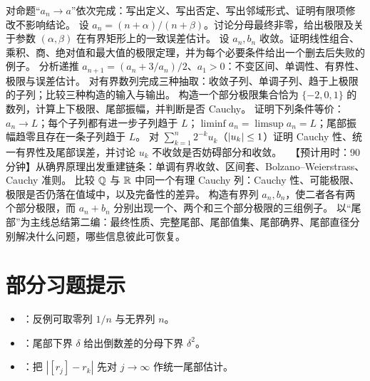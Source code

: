 \begin{enumerate}[label=\textbf{综.\arabic*.}]
  对命题“\(a_n\to a\)”依次完成：写出定义、写出否定、写出邻域形式、证明有限项修改不影响结论。
  设 \(a_n=(n+\alpha)/(n+\beta)\)。讨论分母最终非零，给出极限及关于参数 \((\alpha,\beta)\) 在有界矩形上的一致误差估计。
  设 \(a_n,b_n\) 收敛。证明线性组合、乘积、商、绝对值和最大值的极限定理，并为每个必要条件给出一个删去后失败的例子。
  分析递推 \(a_{n+1}=(a_n+3/a_n)/2\)、\(a_1>0\)：不变区间、单调性、有界性、极限与误差估计。
  对有界数列完成三种抽取：收敛子列、单调子列、趋于上极限的子列；比较三种构造的输入与输出。
  构造一个部分极限集合恰为 \(\{-2,0,1\}\) 的数列，计算上下极限、尾部振幅，并判断是否 Cauchy。
  证明下列条件等价：\(a_n\to L\)；每个子列都有进一步子列趋于 \(L\)；\(\liminf a_n=\limsup a_n=L\)；尾部振幅趋零且存在一条子列趋于 \(L\)。
  对 \(\sum_{k=1}^n2^{-k}u_k\)（\(\left|u_k\right|\le1\)）证明 Cauchy 性、统一有界性及尾部误差，并讨论 \(u_k\) 不收敛是否妨碍部分和收敛。
  \ 【预计用时：90分钟】从确界原理出发重建链条：单调有界收敛、区间套、Bolzano--Weierstrass、Cauchy 准则。
  比较 \(\mathbb{Q}\) 与 \(\mathbb{R}\) 中同一个有理 Cauchy 列：Cauchy 性、可能极限、极限是否仍落在值域中，以及完备性的差异。
  构造有界列 \(a_n,b_n\)，使二者各有两个部分极限，而 \(a_n+b_n\) 分别出现一个、两个和三个部分极限的三组例子。
  以“尾部”为主线总结第二编：最终性质、完整尾部、尾部值集、尾部确界、尾部直径分别解决什么问题，哪些信息彼此可恢复。
\end{enumerate}

\section*{部分习题提示}
\begin{itemize}
 \item {}：反例可取零列 \(1/n\) 与无界列 \(n\)。
 \item {}：尾部下界 \(\delta\) 给出倒数差的分母下界 \(\delta^2\)。
 \item {}：把 \(|[r_j]-r_k|\) 先对 \(j\to\infty\) 作统一尾部估计。
\end{itemize}
